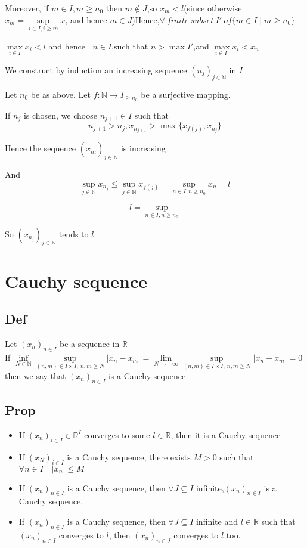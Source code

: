 \documentclass{book}
\begin{document}
Moreover, if $m\in I,m\geq n_0$ then $m\not\in J$,so $x_m<l$(since otherwise $x_m=\sup\limits_{i\in I,i\geq m}x_i$ and hence $m\in J$)Hence,$\forall\ finite\ subset\ I'\ of\{m\in I\mid m\geq n_0\}$

$\max\limits_{i\in I}x_i<l$ and hence $\exists n\in I$,such that $n>\max I'$,and $\max\limits_{i\in I'}x_i<x_n$

We construct by induction an increasing sequence $(n_j)_{j\in \mathbb{N} }$ in $I$

Let $n_0$ be as above. Let $f:\mathbb{N} \rightarrow I_{\geq n_0}$ be a surjective mapping.

If $n_j$ is chosen, we choose $n_{j+1}\in I$ such that $$n_{j+1}>n_j, x_{n_{j+1}}>\max\{x_{f(j)},x_{n_j}\}$$

Hence the sequence $(x_{n_j})_{j\in \mathbb{N} }$ is increasing

And $$\sup\limits_{j\in \mathbb{N} }x_{n_j}\leq\sup\limits_{j\in\mathbb{N} }x_{f(j)}=\sup\limits_{n\in I,n\geq n_0}x_n=l$$

$$l=\sup\limits_{n\in I,n\geq n_0}$$
 
So $(x_{n_j})_{j\in\mathbb{N} }$ tends to $l$
\chapter{Cauchy sequence}
\section{Def}
Let $(x_n)_{n\in I}$ be a sequence in $\mathbb{R} $\\
If $\inf\limits_{N\in \mathbb{N} }\sup\limits_{(n,m)\in I\times I,\ n,m\geq N}\lvert x_n-x_m\rvert=\lim\limits_{N\rightarrow+\infty}\sup\limits_{(n,m)\in I\times I,\ n,m\geq N}\lvert x_n-x_m\rvert=0$ then we say that $(x_n)_{n\in I}$ is a Cauchy sequence
\section{Prop}
\begin{itemize}
    \item If $(x_n)_{i\in I}\in \mathbb{R} ^I$ converges to some $l\in \mathbb{R} $, then it is a Cauchy sequence
    \item If $(x_N)_{i\in I}$ is a Cauchy sequence, there exists $M>0$ such that $ \forall n\in I\quad \lvert x_n\rvert\leq M$
    \item If $(x_n)_{n\in I}$ is a Cauchy sequence, then $\forall J\subseteq I$ infinite,$(x_n)_{n\in I}$ is a Cauchy sequence.
    \item If $(x_n)_{n\in I}$ is a Cauchy sequence, then $\forall J\subseteq I$ infinite and $l\in \mathbb{R} $ such that $(x_n)_{n\in I}$ converges to $l$, then $(x_n)_{n\in J}$ converges to $l$ too.
\end{itemize}
\end{document}

